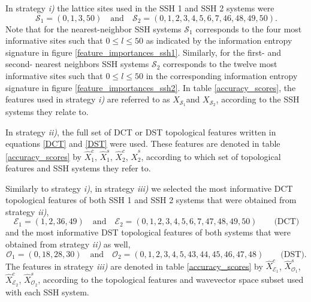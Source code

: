 \documentclass[10pt]{revtex4-1}
\newcommand\xSOne{$X_{\mathcal{S}_1}$}
\newcommand\xcOne{$\hat{X}^c_1$}
\newcommand\xcEOne{$\hat{X}^c_{\mathcal{E}_1}$}
\newcommand\xsOne{$\hat{X}^s_1$}
\newcommand\xsOOne{$\hat{X}^s_{\mathcal{O}_1}$}
\newcommand\xSTwo{$X_{\mathcal{S}_2}$}
\newcommand\xcTwo{$\hat{X}^c_2$}
\newcommand\xcETwo{$\hat{X}^c_{\mathcal{E}_2}$}
\newcommand\xsTwo{$\hat{X}^s_2$}
\newcommand\xsOTwo{$\hat{X}^s_{\mathcal{O}_2}$}
\begin{document}
In strategy \emph{i)} the lattice sites used in the SSH 1 and SSH 2 systems were
\begin{equation}
\label{lattice_subsets}
\mathcal{S}_1 = (0, 1, 3, 50 ) \quad \text{and} \quad  \mathcal{S}_2 =(0, 1, 2, 3, 4, 5, 6, 7, 46, 48, 49, 50).   
\end{equation}
Note that for the nearest-neighbor SSH systems $\mathcal{S}_1$ corresponds to the four most informative sites such that $0\leq l \leq 50$ as indicated by the information entropy signature in figure \ref{feature_importances_ssh1}. Similarly, for the first- and second- nearest neighbors SSH systems $\mathcal{S}_2$ corresponds to the twelve most informative sites such that $0\leq l \leq 50$ in the corresponding information entropy signature in figure \ref{feature_importances_ssh2}. In table \ref{accuracy_scores}, the features used in strategy \emph{i)} are referred to as \xSOne and \xSTwo, according to the SSH systems they relate to.  

In strategy \emph{ii)}, the full set of DCT or DST topological features written in equations \eqref{DCT} and \eqref{DST} were used. These features are denoted in table \ref{accuracy_scores} by \xcOne, \xsOne, \xcTwo, \xsTwo, according to which set of topological features and SSH systems they refer to. 

Similarly to strategy \emph{i)}, in strategy \emph{iii)} we selected the most informative DCT topological features of both SSH 1 and SSH 2 systems that were obtained from strategy \emph{ii)},
\begin{equation}
\label{DCT_subsets}
\mathcal{E}_1 = (1, 2, 36, 49) \quad \text{and} \quad  \mathcal{E}_2 =(0, 1, 2, 3, 4, 5, 6, 7, 47, 48, 49, 50) \qquad \text{(DCT)}  
\end{equation}
and the most informative DST topological features of both systems that were obtained from strategy \emph{ii)} as well,
\begin{equation}
\label{DST_subsets}
\mathcal{O}_1 =  (0, 18, 28, 30) \quad \text{and} \quad  \mathcal{O}_2 = (0, 1, 2, 3, 4, 5, 43, 44, 45, 46, 47, 48) \qquad \text{(DST)}.  
\end{equation}
The features in strategy \emph{iii)} are denoted in table \ref{accuracy_scores} by \xcEOne, \xsOOne, \xcETwo, \xsOTwo,   according to the topological features and wavevector space subset used with each SSH system. 
\end{document}
